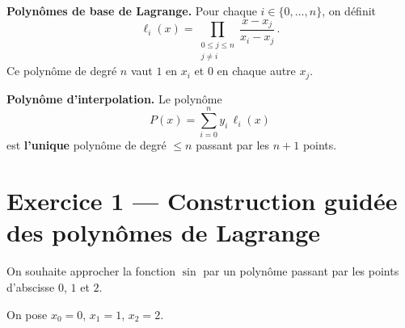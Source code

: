 \begin{mdframed}[backgroundcolor=ThemeLight, linecolor=Theme,
  linewidth=1.5pt, innertopmargin=10pt, innerbottommargin=10pt]
\begin{center}
\end{center}

\textbf{Polynômes de base de Lagrange.}
Pour chaque $i \in \{0, \ldots, n\}$, on définit
\[
  \ell_i(x)
  = \prod_{\substack{0 \leq j \leq n \\ j \neq i}}
    \frac{x - x_j}{x_i - x_j}\,.
\]
Ce polynôme de degré $n$ vaut $1$ en $x_i$ et $0$ en chaque autre $x_j$.

\medskip

\textbf{Polynôme d'interpolation.}
Le polynôme
\[
  P(x) = \sum_{i=0}^{n} y_i \, \ell_i(x)
\]
est \textbf{l'unique} polynôme de degré $\leq n$ passant par les $n+1$ points.

\end{mdframed}

\newpage

\section*{Exercice 1 --- Construction guidée des polynômes de Lagrange}

On souhaite approcher la fonction $\sin$ par un polynôme
passant par les points d'abscisse $0$, $1$ et $2$.

On pose $x_0=0$, $x_1=1$, $x_2=2$.

